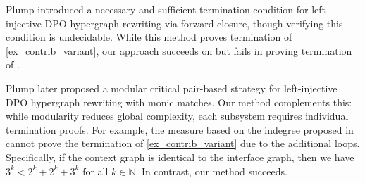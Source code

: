 Plump \cite{plump1995ontermination} introduced a necessary and sufficient termination condition for left-injective DPO hypergraph rewriting via forward closure, though verifying this condition is undecidable. 
While this method proves termination of \autoref{ex_contrib_variant}, our approach succeeds on \cite[Example 3.8]{plump1995ontermination} but fails in proving termination of \cite[Example 4.1]{plump1995ontermination}. 

Plump \cite{plump2018modular} later proposed a modular critical pair-based strategy for left-injective DPO hypergraph rewriting with monic matches. 
Our method complements this: while modularity reduces global complexity, each subsystem requires individual termination proofs. For example, the measure based on the indegree proposed in \cite{plump2018modular} cannot prove the termination of \autoref{ex_contrib_variant} due to the additional loops. Specifically, if the context graph is identical to the interface graph, then we have $3^k < 2^k+2^k+3^k$ for all $k \in \mathbb{N}$. In contrast, our method succeeds.





